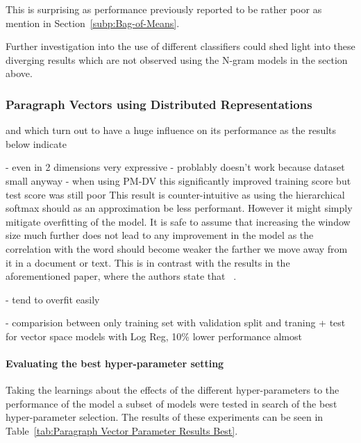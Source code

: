 This is surprising as performance previously reported to be rather poor as mention in Section~\ref{subp:Bag-of-Means}.

 Further investigation into the use of different classifiers could shed light into these diverging results which are not observed using the N-gram models in the section above.

\subsubsection{Paragraph Vectors using Distributed Representations}

and which turn out to have a huge influence on its performance as the results below indicate

- even in 2 dimensions very expressive
- problably doesn't work because dataset small anyway
- when using PM-DV this significantly improved training score but test score was still poor
This result is counter-intuitive as using the hierarchical softmax should as an approximation be less performant. However it might simply mitigate overfitting of the model.
It is safe to assume that increasing the window size much further does not lead to any improvement in the model as the correlation with the word should become weaker the farther we move away from it in a document or text.
This is in contrast with the results in the aforementioned paper, where the authors state that ~\cite{Le:2014aa}.

- tend to overfit easily


- comparision between only training set with validation split and traning + test for vector space models with Log Reg, 10\% lower performance almost


\paragraph{Evaluating the best hyper-parameter setting}

Taking the learnings about the effects of the different hyper-parameters to the performance of the model a subset of models were tested in search of the best hyper-parameter selection. The results of these experiments can be seen in Table~\ref{tab:Paragraph Vector Parameter Results Best}.


